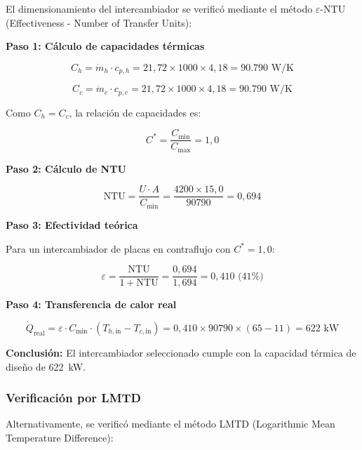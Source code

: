 \documentclass[12pt,a4paper]{article}
\begin{document}
El dimensionamiento del intercambiador se verificó mediante el método $\varepsilon$-NTU (Effectiveness - Number of Transfer Units):

\textbf{Paso 1: Cálculo de capacidades térmicas}

\begin{equation}
C_h = \dot{m}_h \cdot c_{p,h} = 21{,}72 \times 1000 \times 4{,}18 = 90.790 \text{ W/K}
\end{equation}

\begin{equation}
C_c = \dot{m}_c \cdot c_{p,c} = 21{,}72 \times 1000 \times 4{,}18 = 90.790 \text{ W/K}
\end{equation}

Como $C_h = C_c$, la relación de capacidades es:

\begin{equation}
C^* = \frac{C_{\text{min}}}{C_{\text{max}}} = 1{,}0
\end{equation}

\textbf{Paso 2: Cálculo de NTU}

\begin{equation}
\text{NTU} = \frac{U \cdot A}{C_{\text{min}}} = \frac{4200 \times 15{,}0}{90790} = 0{,}694
\end{equation}

\textbf{Paso 3: Efectividad teórica}

Para un intercambiador de placas en contraflujo con $C^* = 1{,}0$:

\begin{equation}
\varepsilon = \frac{\text{NTU}}{1 + \text{NTU}} = \frac{0{,}694}{1{,}694} = 0{,}410 \text{ (41\%)}
\end{equation}

\textbf{Paso 4: Transferencia de calor real}

\begin{equation}
\dot{Q}_{\text{real}} = \varepsilon \cdot C_{\text{min}} \cdot (T_{h,\text{in}} - T_{c,\text{in}}) = 0{,}410 \times 90790 \times (65 - 11) = 622 \text{ kW}
\end{equation}

\textbf{Conclusión:} El intercambiador seleccionado cumple con la capacidad térmica de diseño de 622~kW.

\subsubsection{Verificación por LMTD}

Alternativamente, se verificó mediante el método LMTD (Logarithmic Mean Temperature Difference):
\end{document}

